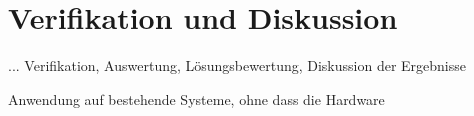 \chapter{Verifikation und Diskussion}
... Verifikation, Auswertung, Lösungsbewertung, Diskussion der Ergebnisse


Anwendung auf bestehende Systeme, ohne dass die Hardware 
